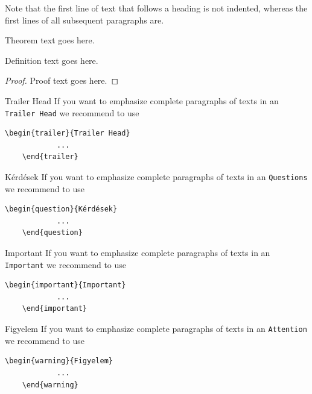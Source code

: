 \documentclass[graybox,envcountchap,sectrefs]{svmono}
\begin{document}
Note that the first line of text that follows a heading is not indented, whereas the first lines of all subsequent paragraphs are.
%
%


\begin{theorem}
	Theorem text goes here.
\end{theorem}
%
\begin{definition}
	Definition text goes here.
\end{definition}
%
\begin{proof}
	Proof text goes here.
\end{proof}
%
%
\begin{trailer}{Trailer Head}
	If you want to emphasize complete paragraphs of texts in an \verb|Trailer Head| we recommend to
	use  \begin{verbatim}\begin{trailer}{Trailer Head}
			...
	\end{trailer}\end{verbatim}
\end{trailer}
%
\begin{question}{Kérdések}
	If you want to emphasize complete paragraphs of texts in an \verb|Questions| we recommend to
	use  \begin{verbatim}\begin{question}{Kérdések}
			...
	\end{question}\end{verbatim}
\end{question}
%
%
\begin{important}{Important}
	If you want to emphasize complete paragraphs of texts in an \verb|Important| we recommend to
	use  \begin{verbatim}\begin{important}{Important}
			...
	\end{important}\end{verbatim}
\end{important}

\begin{warning}{Figyelem}
	If you want to emphasize complete paragraphs of texts in an \verb|Attention| we recommend to
	use  \begin{verbatim}\begin{warning}{Figyelem}
			...
	\end{warning}\end{verbatim}
\end{warning}
\end{document}
